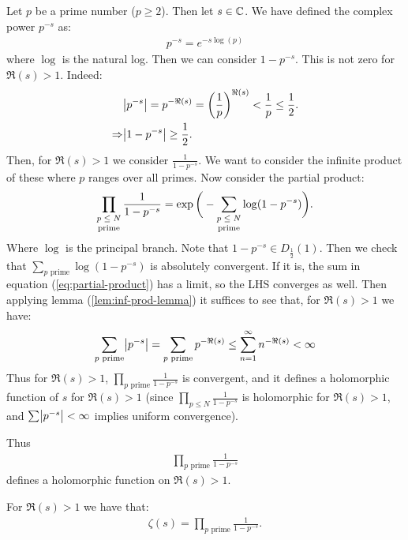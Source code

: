 Let $p$ be a prime number ($p \geq 2$). Then let $s \in \mathbb{C}$. We have defined the complex power $p^{-s}$ as:
\begin{align*}
    p^{-s} = e^{-s\log(p)}
\end{align*}
where $\log$ is the natural log. Then we can consider $1-p^{-s}$. This is not zero for $\Re(s) > 1$. Indeed:
\begin{align*}
    &\abs{p^{-s}} = p^{-\Re(s)} = \left( \frac{1}{p} \right)^{\Re(s)} < \frac{1}{p} \leq \frac{1}{2}.\\
    \Rightarrow &\abs{1-p^{-s}} \geq \frac{1}{2}.
\end{align*}
Then, for $\Re(s)>1$ we consider $\frac{1}{1-p^{-s}}$. We want to consider the infinite product of these where $p$ ranges over all primes. Now consider the partial product:
\begin{align}\label{eq:partial-product}
    \prod_{\text{\stackanchor{$p \leq N$}{prime}}} \frac{1}{1-p^{-s}} = \exp\bigg(-\sum_{\text{\stackanchor{$p \leq N$}{prime}}} \log(1-p^{-s}) \bigg).
\end{align}
Where $\log$ is the principal branch. Note that $1-p^{-s} \in D_{\frac{1}{2}}(1)$. Then we check that $\sum_{p \text{ prime}} \log(1-p^{-s})$ is absolutely convergent. If it is, the sum in equation (\ref{eq:partial-product}) has a limit, so the LHS converges as well. Then applying lemma (\ref{lem:inf-prod-lemma}) it suffices to see that, for $\Re(s) > 1$ we have:
\begin{align*}
    \sum_{p \text{ prime}}\abs{p^{-s}} = \sum_{p \text{ prime}} p^{-\Re(s)} \leq \sum_{n =1}^\infty n^{-\Re(s)} < \infty
\end{align*}
Thus for $\Re(s) > 1$, $\prod_{p \text{ prime}} \frac{1}{1-p^{-s}}$ is convergent, and it defines a holomorphic function of $s$ for $\Re(s) >1$ (since $\prod_{p \leq N} \frac{1}{1-p^{-s}}$ is holomorphic for $\Re(s) >1$, and $\sum\abs{p^{-s}} < \infty$ implies uniform convergence).

Thus
\begin{align*}
    \prod_{p \text{ prime}} \frac{1}{1-p^{-s}}
\end{align*}
defines a holomorphic function on $\Re(s) > 1$.


\begin{theorem}\label{thm:r-euler-prod}
For $\Re(s)>1$ we have that:
\begin{align*}
    \zeta(s) = \prod_{p \text{ prime}} \frac{1}{1-p^{-s}}.
\end{align*}

\end{theorem}

